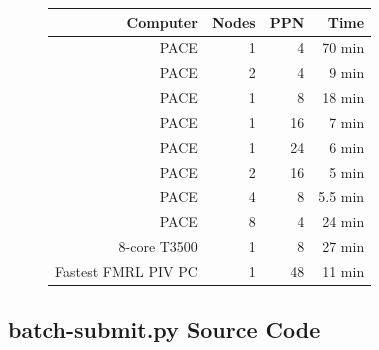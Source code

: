 \documentclass{article}
\begin{document}
\begin{enumerate}
		\begin{figure}[h!]
			\centering
				\begin{tabular}{r | r | r | r}
				Computer & Nodes & PPN & Time \\ \hline
				PACE & 1 & 4 & 70 min \\
				PACE & 2 & 4 & 9 min \\
				PACE & 1 & 8 & 18 min \\
				PACE & 1 & 16 & 7 min \\
				PACE & 1 & 24 & 6 min \\
				PACE & 2 & 16 & 5 min \\
				PACE & 4 & 8 & 5.5 min \\
				PACE & 8 & 4 & 24 min \\
				8-core T3500 & 1 & 8 & 27 min \\
				Fastest FMRL PIV PC & 1 & 48 & 11 min 
			\end{tabular}
		\end{figure}
	\end{enumerate}
	\subsection{batch-submit.py Source Code}
	
    
    \lstset{style=mystyle}
    
\end{document}
